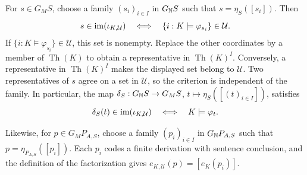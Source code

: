 For $s\in G_MS$, choose a family $(s_i)_{i\in I}$ in
$G_{\mathbb N}S$ such that $s=\eta_S([s_i])$.
Then
\[
 s\in\operatorname{im}(\iota_{K,\mathcal U})
 \quad\Longleftrightarrow\quad
 \{i:K\models\varphi_{s_i}\}\in\mathcal U.
\]
If $\{i:K\models\varphi_{s_i}\}\in\mathcal U$, this set is
nonempty. Replace the other coordinates by a member of $\operatorname{Th}(K)$ to
obtain a representative in $\operatorname{Th}(K)^I$. Conversely, a representative
in $\operatorname{Th}(K)^I$ makes the displayed set belong to $\mathcal U$.
Two representatives of $s$ agree on a set in $\mathcal U$,
so the criterion is independent of the family. In particular, the
map $\delta_S:G_{\mathbb N}S\to G_MS$, $t\mapsto\eta_S([(t)_{i\in I}])$,
satisfies
\[
  \delta_S(t)\in\operatorname{im}(\iota_{K,\mathcal U})
    \quad\Longleftrightarrow\quad K\models\varphi_t .
\]

Likewise, for $p\in G_MP_{A,S}$, choose a family $(p_i)_{i\in I}$
in $G_{\mathbb N}P_{A,S}$ such that $p=\eta_{P_{A,S}}([p_i])$.
Each $p_i$ codes a finite derivation with sentence conclusion,
and the definition of the factorization gives
$e_{K,\mathcal U}(p)=[e_K(p_i)]$.

